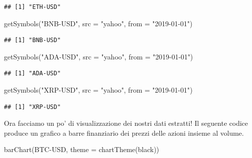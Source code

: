 \documentclass[]{tufte-handout}
\newenvironment{Shaded}{}{}
\newcommand{\AttributeTok}[1]{\textcolor[rgb]{0.49,0.56,0.16}{#1}}
\newcommand{\FunctionTok}[1]{\textcolor[rgb]{0.02,0.16,0.49}{#1}}
\newcommand{\NormalTok}[1]{#1}
\newcommand{\StringTok}[1]{\textcolor[rgb]{0.25,0.44,0.63}{#1}}
\begin{document}
\begin{verbatim}
## [1] "ETH-USD"
\end{verbatim}

\begin{Shaded}
\begin{Highlighting}[]
\FunctionTok{getSymbols}\NormalTok{(}\StringTok{"BNB{-}USD"}\NormalTok{, }\AttributeTok{src =} \StringTok{"yahoo"}\NormalTok{, }\AttributeTok{from =} \StringTok{"2019{-}01{-}01"}\NormalTok{)}
\end{Highlighting}
\end{Shaded}

\begin{verbatim}
## [1] "BNB-USD"
\end{verbatim}

\begin{Shaded}
\begin{Highlighting}[]
\FunctionTok{getSymbols}\NormalTok{(}\StringTok{"ADA{-}USD"}\NormalTok{, }\AttributeTok{src =} \StringTok{"yahoo"}\NormalTok{, }\AttributeTok{from =} \StringTok{"2019{-}01{-}01"}\NormalTok{)}
\end{Highlighting}
\end{Shaded}

\begin{verbatim}
## [1] "ADA-USD"
\end{verbatim}

\begin{Shaded}
\begin{Highlighting}[]
\FunctionTok{getSymbols}\NormalTok{(}\StringTok{"XRP{-}USD"}\NormalTok{, }\AttributeTok{src =} \StringTok{"yahoo"}\NormalTok{, }\AttributeTok{from =} \StringTok{"2019{-}01{-}01"}\NormalTok{)}
\end{Highlighting}
\end{Shaded}

\begin{verbatim}
## [1] "XRP-USD"
\end{verbatim}

Ora facciamo un po' di visualizzazione dei nostri dati estratti! Il
seguente codice produce un grafico a barre finanziario dei prezzi delle
azioni insieme al volume.

\begin{Shaded}
\begin{Highlighting}[]
\FunctionTok{barChart}\NormalTok{(}\StringTok{\textasciigrave{}}\AttributeTok{BTC{-}USD}\StringTok{\textasciigrave{}}\NormalTok{, }\AttributeTok{theme =} \FunctionTok{chartTheme}\NormalTok{(}\StringTok{\textquotesingle{}black\textquotesingle{}}\NormalTok{))}
\end{Highlighting}
\end{Shaded}
\end{document}
